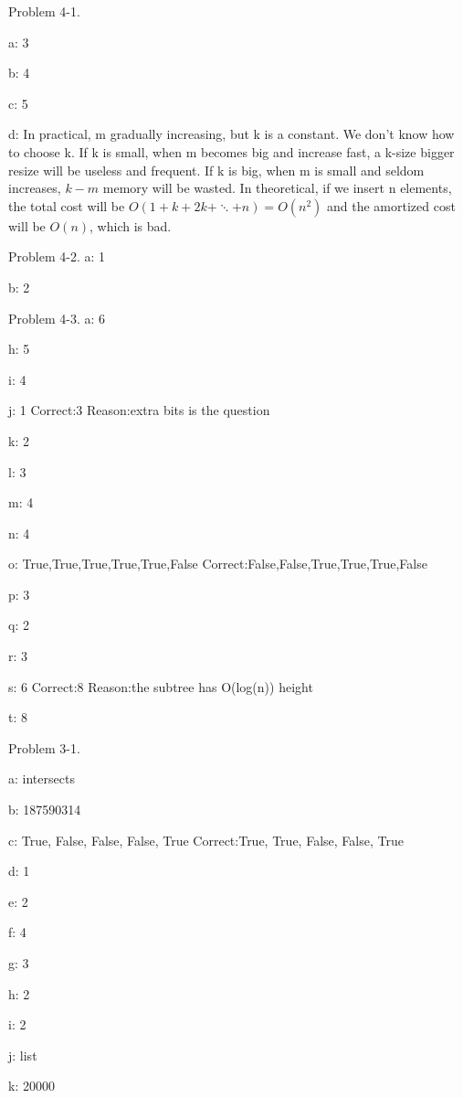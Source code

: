 \documentclass[12pt,twoside]{article}
\begin{document}
Problem 4-1.

  a: 3

  b: 4

  c: 5

  d: In practical, m gradually increasing, but k is a constant. We don't know how to 
  choose k. If k is small, when m becomes big and increase fast, a k-size bigger 
  resize will be useless and frequent. If k is big, when m is small and seldom 
  increases, $k-m$ memory will be wasted. In theoretical, if we insert n elements,
  the total cost will be $O(1+k+2k+\ddots+n) = O(n^2)$ and the amortized cost will
  be $O(n)$, which is bad.

Problem 4-2.
  a: 1

  b: 2

Problem 4-3.
  a: 6

  h: 5

  i: 4

  j: 1 Correct:3 Reason:extra bits is the question

  k: 2

  l: 3

  m: 4

  n: 4

  o: True,True,True,True,True,False Correct:False,False,True,True,True,False

  p: 3

  q: 2

  r: 3

  s: 6 Correct:8 Reason:the subtree has O(log(n)) height

  t: 8

Problem 3-1.

  a: intersects

  b: 187590314

  c: True, False, False, False, True Correct:True, True, False, False, True

  d: 1

  e: 2

  f: 4

  g: 3

  h: 2

  i: 2

  j: list

  k: 20000
\end{document}
